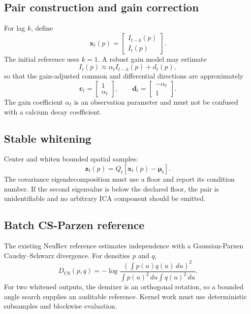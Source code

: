 \documentclass[11pt]{article}
\begin{document}
\subsection{Pair construction and gain correction}

For lag $k$, define
\begin{equation}
\bm x_t(p)=
\begin{bmatrix}
I_{t-k}(p)\\
I_t(p)
\end{bmatrix}.
\label{eq:pair}
\end{equation}
The initial reference uses $k=1$. A robust gain model may estimate
\begin{equation}
I_t(p)\approx \alpha_t I_{t-k}(p)+d_t(p),
\end{equation}
so that the gain-adjusted common and differential directions are approximately
\begin{equation}
\bm c_t=
\begin{bmatrix}1\\ \alpha_t\end{bmatrix},
\qquad
\bm d_t=
\begin{bmatrix}-\alpha_t\\1\end{bmatrix}.
\end{equation}
The gain coefficient $\alpha_t$ is an observation parameter and must not be
confused with a calcium decay coefficient.

\subsection{Stable whitening}

Center and whiten bounded spatial samples:
\begin{equation}
\bm z_t(p)=Q_t[\bm x_t(p)-\bm\mu_t].
\end{equation}
The covariance eigendecomposition must use a floor and report its condition
number. If the second eigenvalue is below the declared floor, the pair is
unidentifiable and no arbitrary ICA component should be emitted.

\subsection{Batch CS-Parzen reference}

The existing NeuRev reference estimates independence with a Gaussian-Parzen
Cauchy--Schwarz divergence. For densities $p$ and $q$,
\begin{equation}
D_{\mathrm{CS}}(p,q)
=-\log
\frac{\left(\int p(u)q(u)\,du\right)^2}
{\int p(u)^2\,du\int q(u)^2\,du}.
\end{equation}
For two whitened outputs, the demixer is an orthogonal rotation, so a bounded
angle search supplies an auditable reference. Kernel work must use deterministic
subsamples and blockwise evaluation.
\end{document}
